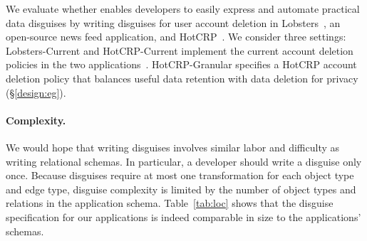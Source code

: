 %
We evaluate whether \sys enables developers to easily express and automate practical data
disguises by writing disguises for user account deletion in Lobsters~\cite{lobsters}, an
open-source news feed application, and HotCRP~\cite{hotcrp}.
%
We consider three settings: Lobsters-Current and HotCRP-Current implement the current account
deletion policies in the two applications~\cite{lobsters:privacy, hotcrp:privacy}.
%
HotCRP-Granular specifies a HotCRP account deletion policy that balances useful data
retention with data deletion for privacy (\S\ref{design:eg}).
%

\paragraph{Complexity.}
%
We would hope that writing disguises involves similar labor and difficulty as writing
relational schemas.
%
In particular, a developer should write a disguise only once.
%
Because disguises require at most one transformation for each object type and edge type,
disguise complexity is limited by the number of object types and relations in the
application schema.
%
Table~\ref{tab:loc} shows that the disguise specification for our applications is indeed
comparable in size to the applications' schemas.
%


